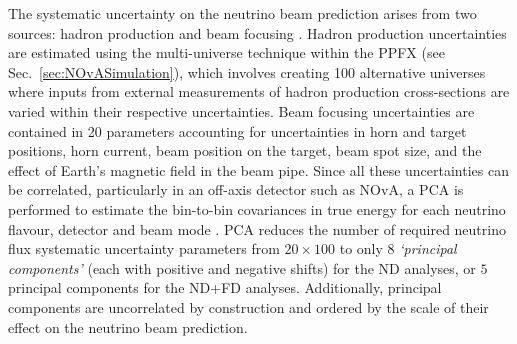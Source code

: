 

The systematic uncertainty on the neutrino beam prediction arises from two sources: hadron production and beam focusing \cite{NuMIFlux.pdf}. Hadron production uncertainties are estimated using the multi-universe technique within the \gls{PPFX} (see Sec.~\ref{sec:NOvASimulation}), which involves creating 100 alternative universes where inputs from external measurements of hadron production cross-sections are varied within their respective uncertainties. Beam focusing uncertainties are contained in 20 parameters accounting for uncertainties in horn and target positions, horn current, beam position on the target, beam spot size, and the effect of Earth's magnetic field in the beam pipe. Since all these uncertainties can be correlated, particularly in an off-axis detector such as \gls{NOvA}, a \gls{PCA} is performed to estimate the bin-to-bin covariances in true energy for each neutrino flavour, detector and beam mode \cite{NitishOscMeasuremetPCAStatisticalAna2021.pdf}. \gls{PCA} reduces the number of required neutrino flux systematic uncertainty parameters from $20\times100$ to only $8$ \textit{`principal components'} (each with positive and negative shifts) for the \gls{ND} analyses, or $5$ principal components for the \gls{ND}+\gls{FD} analyses. Additionally, principal components are uncorrelated by construction and ordered by the scale of their effect on the neutrino beam prediction.

